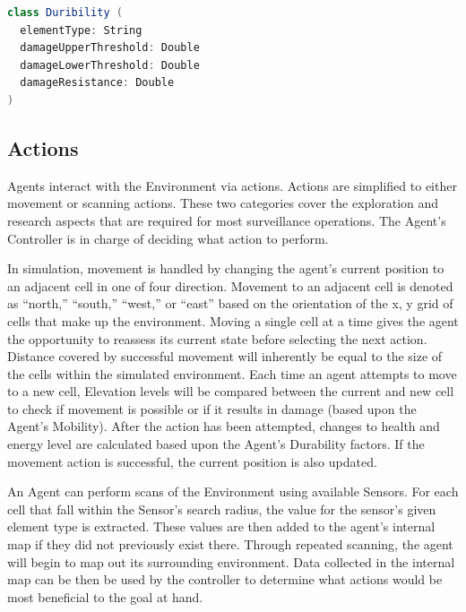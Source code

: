 \begin{lstlisting}[language=Scala]
class Duribility (
  elementType: String
  damageUpperThreshold: Double
  damageLowerThreshold: Double
  damageResistance: Double
)
\end{lstlisting}


\subsection{Actions} \label{subsec:actions}
Agents interact with the Environment via actions.
Actions are simplified to either movement or scanning actions.
These two categories cover the exploration and research aspects that are required for most surveillance operations.
The Agent's Controller is in charge of deciding what action to perform.

In simulation, movement is handled by changing the agent's current position to an adjacent cell in one of four direction.
Movement to an adjacent cell is denoted as ``north,'' ``south,'' ``west,'' or ``east'' based on the orientation of the x, y grid of cells that make up the environment. 
Moving a single cell at a time gives the agent the opportunity to reassess its current state before selecting the next action.
Distance covered by successful movement will inherently be equal to the size of the cells within the simulated environment.
Each time an agent attempts to move to a new cell, Elevation levels will be compared between the current and new cell to check if movement is possible or if it results in damage (based upon the Agent's Mobility).
After the action has been attempted, changes to health and energy level are calculated based upon the Agent's Durability factors.
If the movement action is successful, the current position is also updated.

An Agent can perform scans of the Environment using available Sensors.
For each cell that fall within the Sensor's search radius, the value for the sensor's given element type is extracted.
These values are then added to the agent's internal map if they did not previously exist there.
Through repeated scanning, the agent will begin to map out its surrounding environment.
Data collected in the internal map can be then be used by the controller to determine what actions would be most beneficial to the goal at hand.


